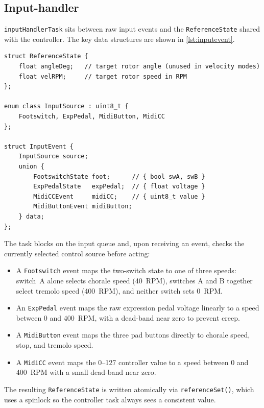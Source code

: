 \subsection{Input-handler}
\texttt{inputHandlerTask} sits between raw input events and the \texttt{ReferenceState}
shared with the controller.
The key data structures are shown in \autoref{lst:inputevent}.

\begin{listing}[H]
	\begin{verbatim}
struct ReferenceState {
    float angleDeg;   // target rotor angle (unused in velocity modes)
    float velRPM;     // target rotor speed in RPM
};

enum class InputSource : uint8_t {
    Footswitch, ExpPedal, MidiButton, MidiCC
};

struct InputEvent {
    InputSource source;
    union {
        FootswitchState foot;      // { bool swA, swB }
        ExpPedalState   expPedal;  // { float voltage }
        MidiCCEvent     midiCC;    // { uint8_t value }
        MidiButtonEvent midiButton;
    } data;
};
\end{verbatim}
	\caption{\texttt{ReferenceState}, \texttt{InputSource}, and \texttt{InputEvent} type definitions.}
	\label{lst:inputevent}
\end{listing}

The task blocks on the input queue and, upon receiving an event, checks the currently selected
control source before acting:

\begin{itemize}
	\item A \texttt{Footswitch} event maps the two-switch state to one of three speeds:
	      switch~A alone selects chorale speed (40~RPM),
	      switches A and B together select tremolo speed (400~RPM),
	      and neither switch sets 0~RPM.
	\item An \texttt{ExpPedal} event maps the raw expression pedal voltage linearly to
	      a speed between 0 and 400~RPM, with a dead-band near zero to prevent creep.
	\item A \texttt{MidiButton} event maps the three pad buttons directly to chorale speed,
	      stop, and tremolo speed.
	\item A \texttt{MidiCC} event maps the 0--127 controller value to a speed between
	      0 and 400~RPM with a small dead-band near zero.
\end{itemize}

The resulting \texttt{ReferenceState} is written atomically via \texttt{referenceSet()},
which uses a spinlock so the controller task always sees a consistent value.

\cleardoublepage


